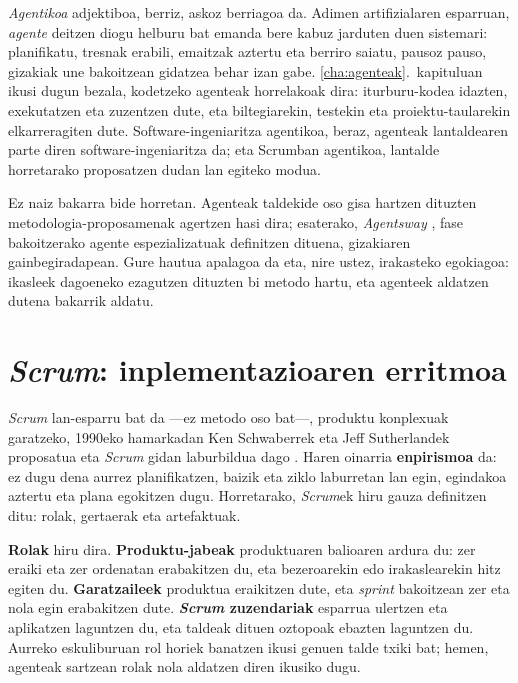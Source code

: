 \textit{Agentikoa} adjektiboa, berriz, askoz berriagoa da.
Adimen artifizialaren esparruan, \textit{agente} deitzen diogu helburu bat emanda bere kabuz jarduten duen sistemari: planifikatu, tresnak erabili, emaitzak aztertu eta berriro saiatu, pausoz pauso, gizakiak une bakoitzean gidatzea behar izan gabe.
\ref{cha:agenteak}.~kapituluan ikusi dugun bezala, kodetzeko agenteak horrelakoak dira: iturburu-kodea idazten, exekutatzen eta zuzentzen dute, eta biltegiarekin, testekin eta proiektu-taularekin elkarreragiten dute.
Software-ingeniaritza agentikoa, beraz, agenteak lantaldearen parte diren software-ingeniaritza da; eta Scrumban agentikoa, lantalde horretarako proposatzen dudan lan egiteko modua.

Ez naiz bakarra bide horretan.
Agenteak taldekide oso gisa hartzen dituzten metodologia-proposamenak agertzen hasi dira; esaterako, \textit{Agentsway} \parencite{bandara2025agentsway}, fase bakoitzerako agente espezializatuak definitzen dituena, gizakiaren gainbegiradapean.
Gure hautua apalagoa da eta, nire ustez, irakasteko egokiagoa: ikasleek dagoeneko ezagutzen dituzten bi metodo hartu, eta agenteek aldatzen dutena bakarrik aldatu.

\section{\textit{Scrum}: inplementazioaren erritmoa}

\textit{Scrum} lan-esparru bat da ---ez metodo oso bat---, produktu konplexuak garatzeko, 1990eko hamarkadan Ken Schwaberrek eta Jeff Sutherlandek proposatua eta \textit{Scrum} gidan laburbildua dago \parencite{schwaber2020scrumguide}.
Haren oinarria \textbf{enpirismoa} da: ez dugu dena aurrez planifikatzen, baizik eta ziklo laburretan lan egin, egindakoa aztertu eta plana egokitzen dugu.
Horretarako, \textit{Scrum}ek hiru gauza definitzen ditu: rolak, gertaerak eta artefaktuak.

\textbf{Rolak} hiru dira.
\textbf{Produktu-jabeak} produktuaren balioaren ardura du: zer eraiki eta zer ordenatan erabakitzen du, eta bezeroarekin edo irakaslearekin hitz egiten du.
\textbf{Garatzaileek} produktua eraikitzen dute, eta \textit{sprint} bakoitzean zer eta nola egin erabakitzen dute.
\textbf{\textit{Scrum} zuzendariak} esparrua ulertzen eta aplikatzen laguntzen du, eta taldeak dituen oztopoak ebazten laguntzen du.
Aurreko eskuliburuan rol horiek banatzen ikusi genuen talde txiki bat; hemen, agenteak sartzean rolak nola aldatzen diren ikusiko dugu.

